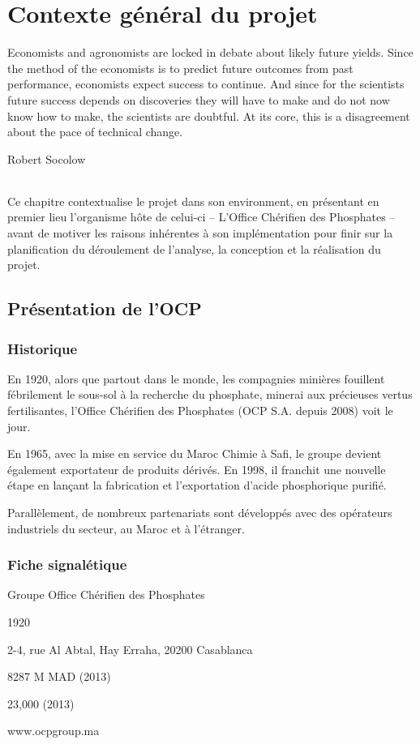 \chapter{Contexte général du projet}
\epigraph{Economists and agronomists are locked in debate about likely
future yields. Since the method of the economists is to predict
future outcomes from past performance, economists expect
success to continue. And since for the scientists future success
depends on discoveries they will have to make and do not now
know how to make, the scientists are doubtful. At its core, this is
a disagreement about the pace of technical change.}{Robert
Socolow}	
\subparagraph{}
Ce chapitre contextualise le projet dans son environment, en présentant en premier lieu l'organisme hôte de celui-ci – L'Office Chérifien des Phosphates – avant de motiver les raisons inhérentes à son implémentation pour finir sur la planification du déroulement de l'analyse, la conception et la réalisation du projet.
\cleardoublepage

\section{Présentation de l’OCP}
	\subsection{Historique}
	En 1920, alors que partout dans le monde, les compagnies minières fouillent fébrilement le
sous-sol à la recherche du phosphate, minerai aux précieuses vertus fertilisantes, l’Office
Chérifien des Phosphates (OCP S.A. depuis 2008) voit le jour.

En 1965, avec la mise en service du Maroc Chimie à Safi, le groupe devient également
exportateur de produits dérivés. En 1998, il franchit une nouvelle étape en lançant la fabrication
et l’exportation d’acide phosphorique purifié.

Parallèlement, de nombreux partenariats sont développés avec des opérateurs industriels du
secteur, au Maroc et à l’étranger.
	\subsection{Fiche signalétique}
	\begin{description}[align=left]
		\item [Nomination sociale :] Groupe Office Chérifien des Phosphates
		\item [Date de création :] 1920
		\item [Siège social :] 2-4, rue Al Abtal, Hay Erraha, 20200 Casablanca
		\item [Capital social :] 8287 M MAD (2013)
		\item [Effectif employé :] 23,000 (2013)
		\item [Site web :] www.ocpgroup.ma
	\end{description}
